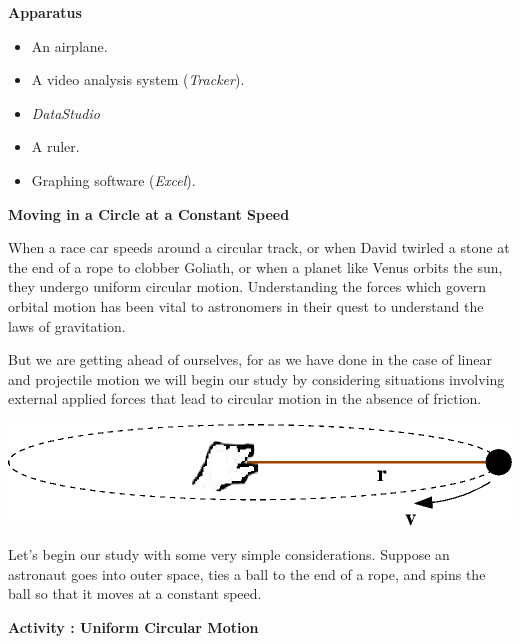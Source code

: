 \textbf{Apparatus}

\begin{itemize}
\item An airplane. 
\item A video analysis system ({\it Tracker}). 
\item {\it DataStudio}
\item A ruler. 
\item Graphing software ({\it Excel}). 
\end{itemize}
\textbf{Moving in a Circle at a Constant Speed }

When a race car speeds around a circular track, or when David twirled a stone
at the end of a rope to clobber Goliath, or when a planet like Venus orbits
the sun, they undergo uniform circular motion. Understanding the forces which
govern orbital motion has been vital to astronomers in their quest to understand
the laws of gravitation. 

But we are getting ahead of ourselves, for as we have done in the case of linear
and projectile motion we will begin our study by considering situations involving
external applied forces that lead to circular motion in the absence of friction.

\vspace{0.3cm}
{\par\centering \includegraphics{iqsCentripetalForce/centripetal_fig2b.eps} \par}
\vspace{0.3cm}

Let's begin our study with some very simple considerations. Suppose an astronaut
goes into outer space, ties a ball to the end of a rope, and spins the ball
so that it moves at a constant speed.

\textbf{Activity : Uniform Circular Motion }

